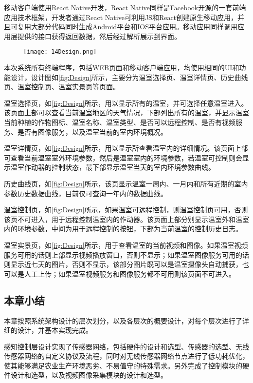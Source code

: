 移动客户端使用React Native开发，React Native同样是Facebook开源的一套前端应用技术框架，开发者通过React Native可利用JS和React创建原生移动应用，并且可复用大部分代码同时生成Android平台和IOS平台应用。移动应用同样调用应用层提供的接口获得返回数据，然后经过解析展示到界面。
	  	\begin{figure}[!htp]
  			\centering
 			\texttt{[image: 14Design.png]}
		\end{figure}
本次系统所有终端程序，包括WEB页面和移动客户端应用，均使用相同的UI和功能设计，设计图如\ref{fig:Design}所示，主要分为温室选择页、温室详情页、历史曲线页、温室控制页、温室实景页等页面。

温室选择页，如\ref{fig:Design}所示，用以显示所有的温室，并可选择任意温室进入。该页面上部可以查看当前温室地区的天气情况，下部列出所有的温室，并显示温室当前种植的作物图标、温室名称、温室类型、是否可以远程控制、是否有视频服务、是否有图像服务，以及温室当前的室内环境概况。

温室详情页，如\ref{fig:Design}所示，用以显示所查看温室内的详细情况。该页面上部可查看当前温室室外环境参数，然后是温室室内的环境参数，若温室可控制则会显示温室作动器的控制状态，最下部显示温室当天的室内环境参数曲线。

历史曲线页，如\ref{fig:Design}所示，该页显示温室一周内、一月内和所有近期的室内参数历史数据曲线，目前仅可查询一年内的数据曲线。

温室控制页，如\ref{fig:Design}所示，如果温室可远程控制，则温室控制页可用，否则该页不可进入，用于远程控制温室内的作动器。该页面上部分别显示温室外和温室内的环境参数，中间为用于远程控制的按钮，下部为当前温室的控制历史日志。

温室实景页，如\ref{fig:Design}所示，用于查看温室的当前视频和图像。如果温室视频服务可用的话则上部显示视频播放窗口，否则不显示；如果温室图像服务可用的话则显示近七天的图片，否则不显示，该部分图片既可以是温室摄像头自动捕获，也可以是人工上传；如果温室视频服务和图像服务都不可用则该页面不可进入。
	\subsection{本章小结}
本章按照系统架构设计的层次划分，以及各层次的概要设计，对每个层次进行了详细的设计，并基本实现完成。

感知控制层设计实现了传感器网络，包括硬件的设计和选型、传感器的选型、无线传感器网络的自定义协议及流程，同时对无线传感器网络节点进行了低功耗优化，使其能够满足农业生产环境恶劣、不易值守的特殊需求。另外完成了控制模块的硬件设计和选型，以及视频图像采集模块的设计和选型。

